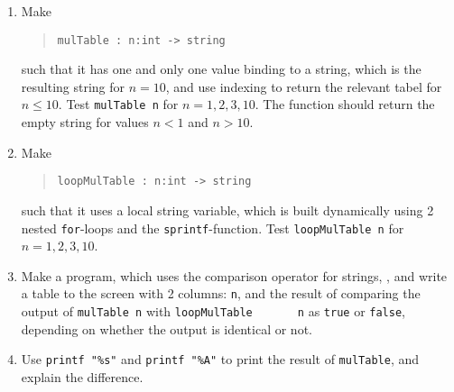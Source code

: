 \begin{enumerate}
\item Make
  \begin{quote}
    \mbox{\lstinline!mulTable : n:int -> string!}
  \end{quote}
  such that it has one and only one value binding to a string, which
  is the resulting string for $n=10$, and use indexing to return the
  relevant tabel for $n\leq 10$.  Test \mbox{\lstinline!mulTable n!}
  for $n= 1, 2, 3, 10$.  The function should return the empty string
  for values $n < 1$ and $n>10$.
\item Make
  \begin{quote}
    \mbox{\lstinline!loopMulTable : n:int -> string!}
  \end{quote}
  such that it uses a local string variable, which is built
  dynamically using 2 nested \lstinline!for!-loops and the \lstinline!sprintf!-function.  Test \mbox{\lstinline!loopMulTable n!} for $n= 1, 2, 3, 10$.
  \item Make a program, which uses the comparison operator for
    strings, \lexeme{=}, and write a table to the screen with 2
    columns: \lstinline!n!, and the result of comparing the output of
    \mbox{\lstinline!mulTable n!} with \mbox{\lstinline!loopMulTable
      n!} as \lstinline!true! or \lstinline!false!, depending on
    whether the output is identical or not.
  \item Use \lstinline!printf "%s"!%
    and \lstinline!printf "%A"!%
    to print the result of \lstinline!mulTable!, and explain the difference.
  \end{enumerate}
